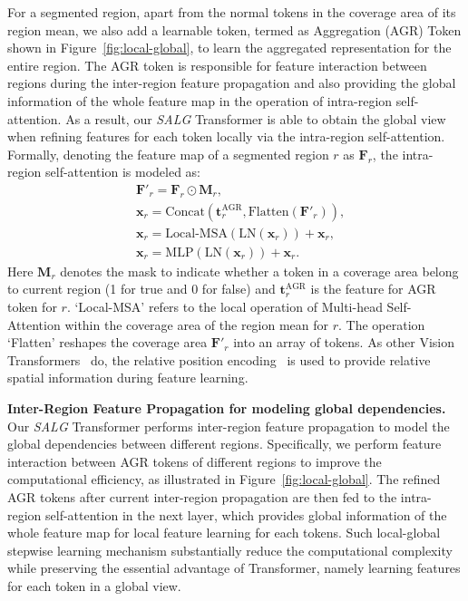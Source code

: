 For a segmented region, apart from the normal tokens in the coverage area of its region mean, we also add a learnable token, termed as Aggregation (AGR) Token shown in Figure~\ref{fig:local-global}, to learn the aggregated representation for the entire region. The AGR token is responsible for feature interaction between regions during the inter-region feature propagation and also providing the global information of the whole feature map in the operation of intra-region self-attention. As a result, our \emph{SALG} Transformer is able to obtain the global view when refining features for each token locally via the intra-region self-attention. Formally, denoting the feature map of a segmented region $r$ as $\mathbf{F}_r$, the intra-region self-attention is modeled as:
\begin{equation}
\begin{split}
    &\mathbf{F}'_r = \mathbf{F}_r \odot \mathbf{M}_r, \\
    &\mathbf{x}_r = \text{Concat} (\mathbf{t}^\text{AGR}_r, \text{Flatten}(\mathbf{F}'_r)), \\
    &\mathbf{x}_{r} = \text{Local-MSA}(\mathrm{LN}(\mathbf{x}_{r}))+\mathbf{x}_{r},\\
    &\mathbf{x}_{r} = \text{MLP}(\text{LN}(\mathbf{x}_{r}))+\mathbf{x}_{r}.
\end{split}
\end{equation}
Here $\mathbf{M}_r$ denotes the mask to indicate whether a token in a coverage area belong to current region (1 for true and 0 for false) and $\mathbf{t}^\text{AGR}_r$ is the feature for AGR token for $r$. `Local-MSA' refers to the local operation of Multi-head Self-Attention within the coverage area of the region mean for $r$. The operation `Flatten' reshapes the coverage area $\mathbf{F}'_r$ into an array of tokens. As other Vision Transformers~\cite{liu2021swin} do, the relative position encoding~\cite{shaw2018self} is used to provide relative spatial information during feature learning.

\smallskip\noindent\textbf{Inter-Region Feature Propagation for modeling global dependencies.}
Our \emph{SALG} Transformer performs inter-region feature propagation to model the global dependencies between different regions. Specifically, we perform feature interaction between AGR tokens of different regions to improve the computational efficiency, as illustrated in Figure~\ref{fig:local-global}. The refined AGR tokens after current inter-region propagation are then fed to the intra-region self-attention in the next layer, which provides global information of the whole feature map for local feature learning for each tokens. Such local-global stepwise learning mechanism substantially reduce the computational complexity while preserving the essential advantage of Transformer, namely learning features for each token in a global view.

